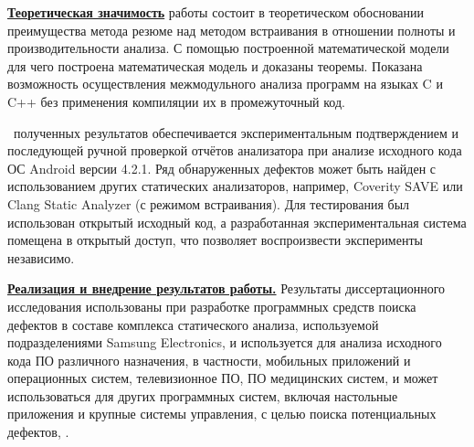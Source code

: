 {\underline{\textbf{Теоретическая значимость}} работы состоит в теоретическом обосновании преимущества метода резюме над методом встраивания в отношении полноты и производительности анализа. С помощью построенной математической модели для чего построена математическая модель  и доказаны теоремы. Показана возможность осуществления межмодульного анализа программ на языках C и C++ без применения компиляции их в промежуточный код.

\reliability\ полученных результатов обеспечивается экспериментальным подтверждением и последующей ручной проверкой отчётов анализатора при анализе исходного кода ОС Android версии 4.2.1. Ряд обнаруженных дефектов может быть найден с использованием других статических анализаторов, например, Coverity SAVE или Clang Static Analyzer (с режимом встраивания). Для тестирования был использован открытый исходный код, а разработанная экспериментальная система помещена в открытый доступ, что позволяет воспроизвести эксперименты независимо.


\underline{\textbf{Реализация и внедрение результатов работы.}} Результаты диссертационного исследования использованы при разработке программных средств поиска дефектов в составе комплекса статического анализа, используемой подразделениями Samsung Electronics, и используется для анализа исходного кода ПО различного назначения, в частности, мобильных приложений и операционных систем, телевизионное ПО, ПО медицинских систем, и может использоваться для других программных систем, включая настольные приложения и крупные системы управления, с целью поиска потенциальных дефектов, .

}
